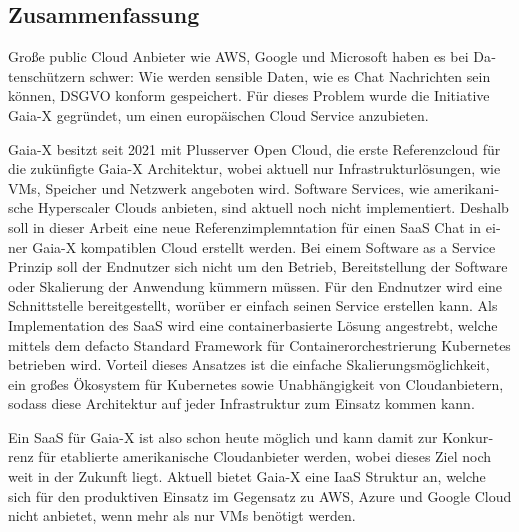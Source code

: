 \begin{otherlanguage}{ngerman}
	\chapter*{Zusammenfassung}

	Große public Cloud Anbieter wie AWS, Google und Microsoft haben es bei Datenschützern schwer:
	Wie werden sensible Daten, wie es Chat Nachrichten sein können, DSGVO konform gespeichert.
	Für dieses Problem wurde die Initiative Gaia-X gegründet, um einen europäischen Cloud Service anzubieten.


	Gaia-X besitzt seit 2021 mit Plusserver Open Cloud, die erste Referenzcloud für die zukünfigte Gaia-X Architektur,
	wobei aktuell nur Infrastrukturlösungen, wie \acp{VM}, Speicher und Netzwerk angeboten wird. 
	Software Services, wie amerikanische Hyperscaler Clouds anbieten, sind aktuell noch nicht implementiert.
	Deshalb soll in dieser Arbeit eine neue Referenzimplemntation für einen \ac{SaaS} Chat in einer Gaia-X kompatiblen Cloud erstellt werden.
	Bei einem Software as a Service Prinzip soll der Endnutzer sich nicht um den Betrieb, Bereitstellung der Software
	oder Skalierung der Anwendung kümmern müssen. Für den Endnutzer wird eine Schnittstelle bereitgestellt, 
	worüber er einfach seinen Service erstellen kann.
	Als Implementation des \ac{SaaS} wird eine containerbasierte Lösung angestrebt, welche mittels dem defacto Standard Framework für 
	Containerorchestrierung Kubernetes betrieben wird. Vorteil dieses Ansatzes ist die einfache Skalierungsmöglichkeit,
	ein großes Ökosystem für Kubernetes sowie Unabhängigkeit von Cloudanbietern, 
	sodass diese Architektur auf jeder Infrastruktur zum Einsatz kommen kann.

	Ein \ac{SaaS} für Gaia-X ist also schon heute möglich und kann damit zur Konkurrenz für etablierte amerikanische Cloudanbieter werden,
	wobei dieses Ziel noch weit in der Zukunft liegt. Aktuell bietet Gaia-X eine \ac{IaaS} Struktur an,
	welche sich für den produktiven Einsatz im Gegensatz zu AWS, Azure und Google Cloud nicht anbietet,
	wenn mehr als nur \acp{VM} benötigt werden.
\end{otherlanguage}
